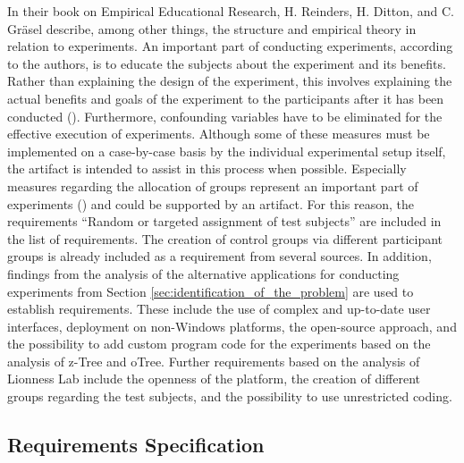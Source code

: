 In their book on Empirical Educational Research, H. Reinders, H. Ditton, and C. Gräsel describe, among other things, the structure and empirical theory in relation to experiments. An important part of conducting experiments, according to the authors, is to educate the subjects about the experiment and its benefits. Rather than explaining the design of the experiment, this involves explaining the actual benefits and goals of the experiment to the participants after it has been conducted (\cite{Gniewosz.2011}). Furthermore, confounding variables have to be eliminated for the effective execution of experiments. Although some of these measures must be implemented on a case-by-case basis by the individual experimental setup itself, the artifact is intended to assist in this process when possible. Especially measures regarding the allocation of groups represent an important part of experiments (\cite{Gniewosz.2011}) and could be supported by an artifact. For this reason, the requirements \enquote{Random or targeted assignment of test subjects} are included in the list of requirements. The creation of control groups via different participant groups is already included as a requirement from several sources. In addition, findings from the analysis of the alternative applications for conducting experiments from Section \ref{sec:identification_of_the_problem} are used to establish requirements. These include the use of complex and up-to-date user interfaces, deployment on non-Windows platforms, the open-source approach, and the possibility to add custom program code for the experiments based on the analysis of z-Tree and oTree. Further requirements based on the analysis of Lionness Lab include the openness of the platform, the creation of different groups regarding the test subjects, and the possibility to use unrestricted coding.

\subsection{Requirements Specification}\label{subsec:reqSpec}

